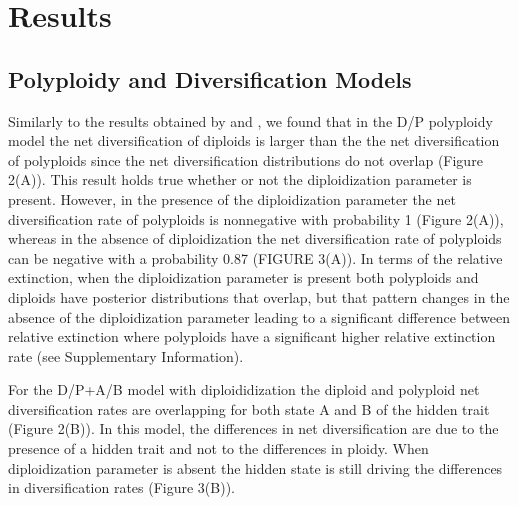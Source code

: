 \section{Results}

 
\subsection{Polyploidy and Diversification Models}
Similarly to the results obtained by \citet{mayrose_2011} and \citet{mayrose_2015}, we found that in the D/P polyploidy model the net diversification of diploids is larger than the the net diversification of polyploids since the net diversification distributions do not overlap (Figure 2(A)). This result holds true whether or not the diploidization parameter is present. However, in the presence of  the diploidization parameter the net diversification rate of polyploids is nonnegative with probability 1 (Figure 2(A)), whereas in the absence of diploidization the net diversification rate of polyploids can be negative with a probability 0.87 (FIGURE 3(A)). In terms of the relative extinction, when the diploidization parameter is present both polyploids and diploids have posterior distributions that overlap, but that pattern changes in the absence of the diploidization parameter leading to a significant difference between relative extinction where polyploids have a significant higher relative extinction rate (see Supplementary Information).\newline

For the D/P+A/B model with diploididization the diploid and polyploid net diversification rates are overlapping for both state A and B of the hidden trait (Figure 2(B)). In this model, the differences in net diversification are due to the presence of a hidden trait and not to the differences in ploidy. When diploidization parameter is absent the hidden state is still driving the differences in diversification rates (Figure 3(B)).

